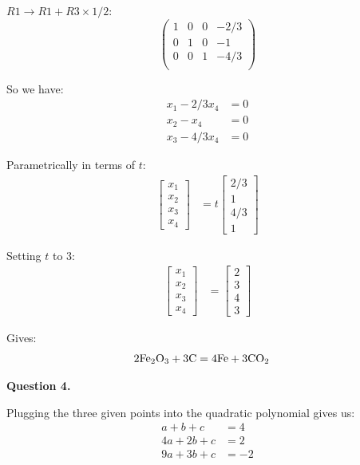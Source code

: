\documentclass[12pt,a4paper]{report}
\begin{document}
\( R1 \rightarrow R1 + R3 \times 1/2 \):
 \[
 \left(\begin{array}{rrrr}
   1 & 0 & 0 & -2/3 \\
   0 & 1 & 0  & -1 \\
   0 & 0 & 1 & -4/3 \\
   \end{array} \right)
\]

So we have:
\begin{align*}
x_1 - 2/3x_4 &= 0 \\
x_2 -    x_4 &= 0 \\
x_3 -    4/3x_4 &= 0
\end{align*} 

Parametrically in terms of \(t\):
\begin{align*}
\begin{bmatrix}x_1\\x_2\\x_3\\x_4\end{bmatrix} &= t \begin{bmatrix}2/3\\1\\4/3\\1\end{bmatrix}
\end{align*} 

Setting \(t\) to \(3\):
\begin{align*}
\begin{bmatrix}x_1\\x_2\\x_3\\x_4\end{bmatrix} &= \begin{bmatrix}2\\3\\4\\3\end{bmatrix}
\end{align*} 

Gives:
\begin{align*}
 2\text{Fe\textsubscript{2}O\textsubscript{3}} + 3\text{C} &= 4\text{Fe} + 3\text{CO\textsubscript{2}}
\end{align*} 

\textbf{Question 4.}

Plugging the three given points into the quadratic polynomial gives us:
\begin{align*}
  a +  b + c &= 4  \\
 4a + 2b + c &= 2  \\
 9a + 3b + c &= -2 
\end{align*} 
\end{document}
